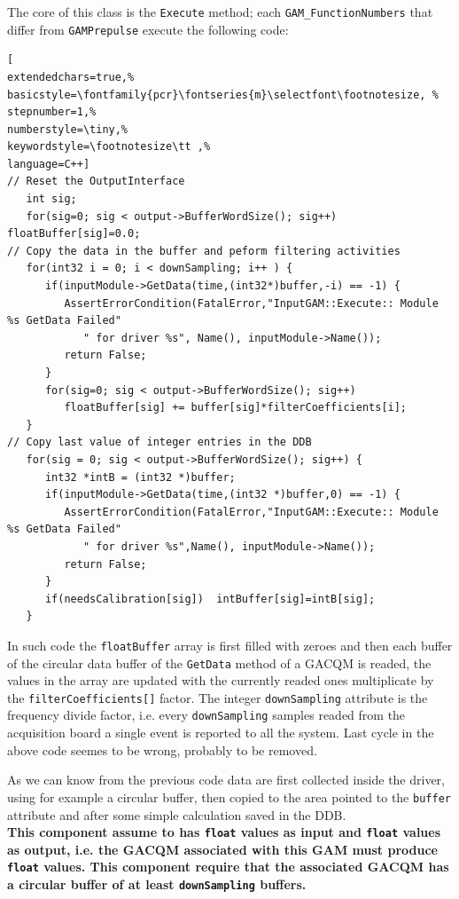 The core of this class is the \texttt{Execute} method; each \texttt{GAM\_FunctionNumbers} that differ from \texttt{GAMPrepulse} execute the following code:

\begin{lstlisting}[
extendedchars=true,%
basicstyle=\fontfamily{pcr}\fontseries{m}\selectfont\footnotesize, %
stepnumber=1,%
numberstyle=\tiny,%
keywordstyle=\footnotesize\tt ,%
language=C++]
// Reset the OutputInterface
   int sig;
   for(sig=0; sig < output->BufferWordSize(); sig++) floatBuffer[sig]=0.0;
// Copy the data in the buffer and peform filtering activities 
   for(int32 i = 0; i < downSampling; i++ ) {
      if(inputModule->GetData(time,(int32*)buffer,-i) == -1) {
         AssertErrorCondition(FatalError,"InputGAM::Execute:: Module %s GetData Failed"
            " for driver %s", Name(), inputModule->Name());
         return False;
      }
      for(sig=0; sig < output->BufferWordSize(); sig++)
         floatBuffer[sig] += buffer[sig]*filterCoefficients[i];
   }
// Copy last value of integer entries in the DDB
   for(sig = 0; sig < output->BufferWordSize(); sig++) {
      int32 *intB = (int32 *)buffer;
      if(inputModule->GetData(time,(int32 *)buffer,0) == -1) {
         AssertErrorCondition(FatalError,"InputGAM::Execute:: Module %s GetData Failed"
            " for driver %s",Name(), inputModule->Name());
         return False;
      }
      if(needsCalibration[sig])  intBuffer[sig]=intB[sig];
   }
\end{lstlisting}

In such code the \texttt{floatBuffer} array is first filled with zeroes and then each buffer of the circular data buffer of the \texttt{GetData} method of a GACQM is readed, the values in the array are updated with the currently readed ones multiplicate by the \texttt{filterCoefficients[]} factor. The integer \texttt{downSampling} attribute is the frequency divide factor, i.e. every \texttt{downSampling} samples readed from the acquisition board a single event is reported to all the system. Last cycle in the above code seemes to be wrong, probably to be removed.


As we can know from the previous code data are first collected inside the driver, using for example a circular buffer, then copied to the area pointed to the \texttt{buffer} attribute and after some simple calculation saved in the DDB.\\


\textbf{This component assume to has \texttt{float} values as input and \texttt{float} values as output, i.e. the GACQM associated with this GAM must produce \texttt{float} values. This component require that the associated GACQM has a circular buffer of at least \texttt{downSampling} buffers.} \\


